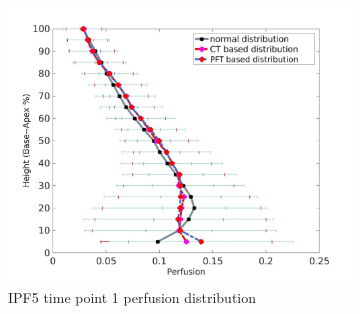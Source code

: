 \begin{figure}[htbp]
\begin{subfigure}{.6\linewidth}
  \includegraphics[width=\linewidth,trim={{.0\wd0} {.0\wd0} {.0\wd0} {.0\wd0}},clip]{Appendix/Image_AppexB/IPF511/IPF511_PerfusionAgainstLungHeight.jpg}
  \caption{IPF5 time point 1 perfusion distribution}
  \label{fig:IPF511VQDistribution-b}
\end{subfigure}
\begin{subfigure}{.6\linewidth}%

\end{subfigure}
\end{figure}
